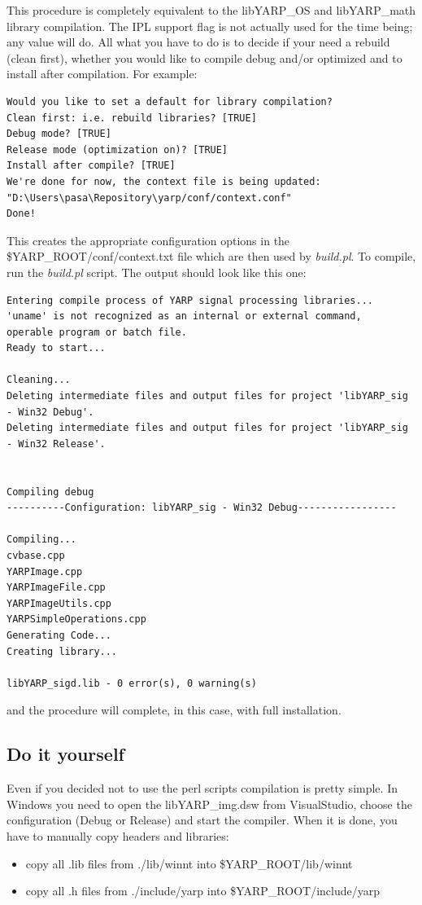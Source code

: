 This procedure is completely equivalent to the libYARP\_OS and libYARP\_math library compilation. The IPL support flag is not actually used for the time being; any value will do. All what you have to do is to decide if your need a rebuild (clean first), whether you would like to compile debug and/or optimized and to install after compilation. For example:

\begin{verbatim}
Would you like to set a default for library compilation?
Clean first: i.e. rebuild libraries? [TRUE]
Debug mode? [TRUE]
Release mode (optimization on)? [TRUE]
Install after compile? [TRUE]
We're done for now, the context file is being updated: 
"D:\Users\pasa\Repository\yarp/conf/context.conf"
Done!
\end{verbatim}

This creates the appropriate configuration options in the \$YARP\_ROOT/conf/context.txt file which are then used by {\em build.pl}. To compile, run the {\em build.pl} script. The output should look like this one:

\begin{verbatim}
Entering compile process of YARP signal processing libraries...
'uname' is not recognized as an internal or external command,
operable program or batch file.
Ready to start...

Cleaning...
Deleting intermediate files and output files for project 'libYARP_sig 
- Win32 Debug'.
Deleting intermediate files and output files for project 'libYARP_sig 
- Win32 Release'.


Compiling debug
----------Configuration: libYARP_sig - Win32 Debug-----------------

Compiling...
cvbase.cpp
YARPImage.cpp
YARPImageFile.cpp
YARPImageUtils.cpp
YARPSimpleOperations.cpp
Generating Code...
Creating library...

libYARP_sigd.lib - 0 error(s), 0 warning(s)

\end{verbatim}

\noindent and the procedure will complete, in this case, with full installation.


\subsection{Do it yourself}
Even if you decided not to use the perl scripts compilation is pretty simple. In Windows you need to open the libYARP\_img.dsw from VisualStudio, choose the configuration (Debug or Release) and start the compiler. When it is done, you have to manually copy headers and libraries:
\begin{itemize}
\item copy all .lib files from ./lib/winnt into \$YARP\_ROOT/lib/winnt
\item copy all .h files from ./include/yarp into \$YARP\_ROOT/include/yarp
\end{itemize}

